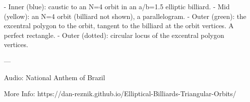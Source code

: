 - Inner (blue): caustic to an N=4 orbit in an a/b=1.5 elliptic billiard.
- Mid (yellow): an N=4 orbit (billiard not shown), a parallelogram.
- Outer (green): the excentral polygon to the orbit, tangent to the billiard at the orbit vertices. A perfect rectangle.
- Outer (dotted): circular locus of the excentral polygon vertices.

---

Audio: National Anthem of Brazil

More Info: https://dan-reznik.github.io/Elliptical-Billiards-Triangular-Orbits/